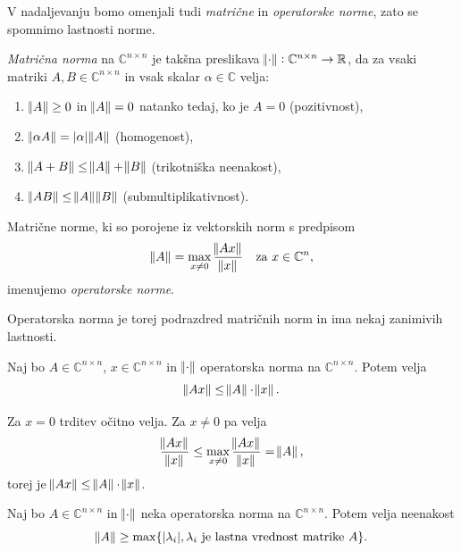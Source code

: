\documentclass[mat1]{fmfdelo}
\newcommand{\R}{\mathbb R}
\newcommand{\C}{\mathbb C}
\begin{document}
V nadaljevanju bomo omenjali tudi \emph{matrične} in \emph{operatorske norme}, zato se spomnimo lastnosti norme.
\begin{definicija}
    \emph{Matrična norma} na $\C^{n \times n}$ je takšna preslikava $\norm{\cdot}: \C^{n \times n} \rightarrow \R$, da za vsaki matriki $A, B \in \C^{n \times n}$ in vsak skalar $\alpha \in \C$ velja:
    \begin{enumerate}
        \item $\norm{A} \geq 0$ in $\norm{A} = 0$ natanko tedaj, ko je $A = 0$ (pozitivnost),
        \item $\norm{\alpha A} = |\alpha|\norm{A}$ (homogenost),
        \item $\norm{A + B} \leq \norm{A} + \norm{B}$ (trikotniška neenakost), 
        \item $\norm{A B} \leq \norm{A} \norm{B}$ (submultiplikativnost).
    \end{enumerate}
    Matrične norme, ki so porojene iz vektorskih norm s predpisom
    \begin{equation}
        \norm{A} = \max_{x \neq 0} \frac{\norm{A x}}{\norm{x}}\quad \text{za}\ x\in \C^n,
    \end{equation}
    imenujemo \emph{operatorske norme}.
\end{definicija}
Operatorska norma je torej podrazdred matričnih norm in ima nekaj zanimivih lastnosti.
\begin{trditev}\label{trditevOperatorska}
    Naj bo $A \in \C^{n \times n}$, $x \in \C^{n \times n}$ in $\norm{\cdot}$ operatorska norma na $\C^{n \times n}$. Potem velja
    \begin{equation}
        \norm{A x} \leq \norm{A} \cdot \norm{x}.
    \end{equation}
\end{trditev}
\begin{dokaz}
    Za $x = 0$ trditev očitno velja. Za $x \neq 0$ pa velja
    \begin{equation}
        \frac{\norm{A x}}{\norm{x}} \leq \max_{x \neq 0} \frac{\norm{A x}}{\norm{x}} = \norm{A},
    \end{equation}
    torej je $\norm{A x} \leq \norm{A} \cdot \norm{x}$.
\end{dokaz}
\begin{posledica}\label{posledicaOperatorskaNorma}
    Naj bo $A \in \C^{n \times n}$ in $\norm{\cdot}$ neka operatorska norma na $\C^{n \times n}$. Potem velja neenakost
    \begin{equation}
        \norm{A} \geq \max\{|\lambda_i|, \lambda_i\  \text{je lastna vrednost matrike}\  A\}.
    \end{equation}
\end{posledica}
\end{document}
